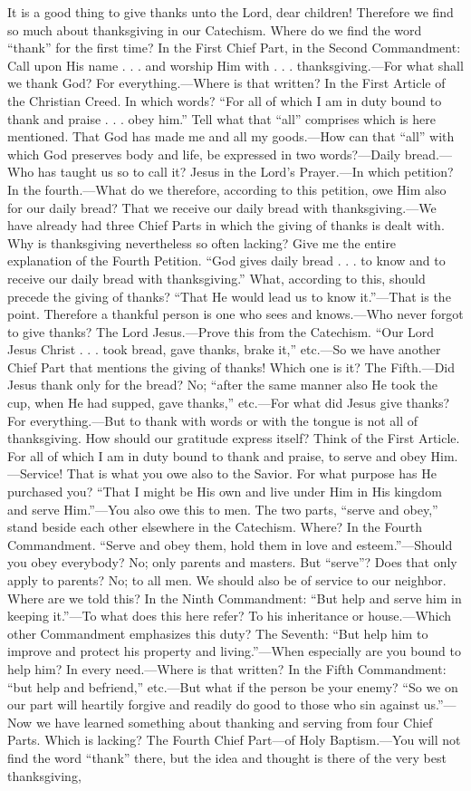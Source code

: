 It is a good thing to give thanks unto the Lord, dear children! Therefore we find so much about thanksgiving in our Catechism. Where do we find the word “thank” for the first time? In the First Chief Part, in the Second Commandment: Call upon His name . . . and worship Him with . . . thanksgiving.—For what shall we thank God? For everything.—Where is that written? In the First Article of the Christian Creed. In which words? “For all of which I am in duty bound to thank and praise . . . obey him.” Tell what that “all” comprises which is here mentioned. That God has made me and all my goods.—How can that “all” with which God preserves body and life, be expressed in two words?—Daily bread.—Who has taught us so to call it? Jesus in the Lord’s Prayer.—In which
petition? In the fourth.—What do we therefore, according to this petition, owe Him also for our daily bread? That we receive our daily bread with thanksgiving.—We have already had three Chief Parts in which the giving of thanks is dealt with. Why is thanksgiving nevertheless so often lacking? Give me the entire explanation of the Fourth Petition. “God gives daily bread . . . to know and to receive our daily bread with thanksgiving.” What, according to this, should precede the giving of thanks? “That He would lead us to know it.”—That is the point. Therefore a thankful person is one who sees and knows.—Who never forgot to give thanks? The Lord Jesus.—Prove this from the Catechism. “Our Lord Jesus Christ . . . took bread, gave thanks, brake it,” etc.—So we have another Chief Part that mentions the giving of thanks! Which one is it? The Fifth.—Did Jesus thank only for the bread? No; “after the same manner also He took the cup, when He had supped, gave thanks,” etc.—For what did Jesus give thanks? For everything.—But to thank with words or with the tongue is not all of thanksgiving. How should our gratitude express itself? Think of the First Article. For all of which I am in duty bound to thank and praise, to serve and obey Him.—Service! That is what you owe also to the Savior. For what purpose has He purchased you? “That I might be His own and live under Him in His kingdom and serve Him.”—You also owe this to men. The two parts, “serve and obey,” stand beside each other elsewhere in the Catechism. Where? In the Fourth Commandment. “Serve and obey them, hold them in love and esteem.”—Should you obey everybody? No; only parents and masters. But “serve”? Does that only apply to parents? No; to all men. We should also be of service to our neighbor. Where are we told this? In the Ninth Commandment: “But help and serve him in keeping it.”—To what does this here refer? To his inheritance or house.—Which other Commandment emphasizes this duty? The Seventh: “But help him to improve and protect his property and living.”—When especially are you bound to help him? In every need.—Where is that written? In the Fifth Commandment: “but help and befriend,” etc.—But what if the person be your enemy? “So we on our part will heartily forgive and readily do good to those who sin against us.”—Now we have learned something about thanking and serving from four Chief Parts. Which is lacking? The Fourth Chief Part—of Holy Baptism.—You will not find the word “thank” there, but the idea and thought is there of the very best thanksgiving, 